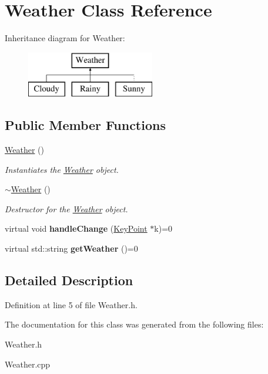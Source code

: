 \hypertarget{classWeather}{}\section{Weather Class Reference}
\label{classWeather}
Inheritance diagram for Weather\+:\begin{figure}[H]
\begin{center}
\leavevmode
\includegraphics[height=2.000000cm]{classWeather}
\end{center}
\end{figure}
\subsection*{Public Member Functions}
\begin{DoxyCompactItemize}
\item 
\mbox{\label{classWeather_aa404c94fec05b825454a7309827767c6}} 
\hyperlink{classWeather_aa404c94fec05b825454a7309827767c6}{Weather} ()
\begin{DoxyCompactList}\small\item\em Instantiates the \hyperlink{classWeather}{Weather} object. \end{DoxyCompactList}\item 
\mbox{\label{classWeather_a6cc4f6ce440531f5c882547dcf40eb22}} 
\hyperlink{classWeather_a6cc4f6ce440531f5c882547dcf40eb22}{$\sim$\+Weather} ()
\begin{DoxyCompactList}\small\item\em Destructor for the \hyperlink{classWeather}{Weather} object. \end{DoxyCompactList}\item 
\mbox{\label{classWeather_af697ebc3ce0db3c7c6bc9b45854114e7}} 
virtual void {\bfseries handle\+Change} (\hyperlink{classKeyPoint}{Key\+Point} $\ast$k)=0
\item 
\mbox{\label{classWeather_ad0a29227308b87e98808cdff52232df3}} 
virtual std\+::string {\bfseries get\+Weather} ()=0
\end{DoxyCompactItemize}


\subsection{Detailed Description}


Definition at line 5 of file Weather.\+h.



The documentation for this class was generated from the following files\+:\begin{DoxyCompactItemize}
\item 
Weather.\+h\item 
Weather.\+cpp\end{DoxyCompactItemize}

